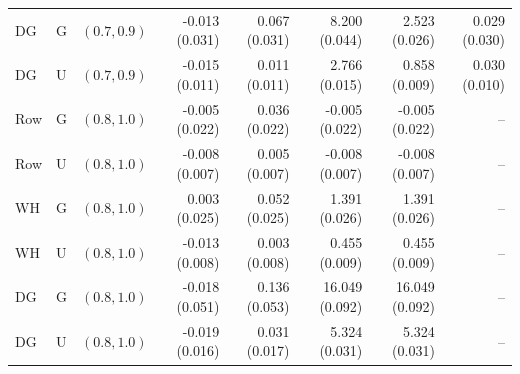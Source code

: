 \begin{tabular}{@{}lllrrrrr@{}}
DG & G & $(0.7,0.9)$ & -0.013 (0.031) & 0.067 (0.031) & 8.200 (0.044) & 2.523 (0.026) & 0.029 (0.030) \\
DG & U & $(0.7,0.9)$ & -0.015 (0.011) & 0.011 (0.011) & 2.766 (0.015) & 0.858 (0.009) & 0.030 (0.010) \\
\midrule
Row & G & $(0.8,1.0)$ & -0.005 (0.022) & 0.036 (0.022) & -0.005 (0.022) & -0.005 (0.022) & -- \\
Row & U & $(0.8,1.0)$ & -0.008 (0.007) & 0.005 (0.007) & -0.008 (0.007) & -0.008 (0.007) & -- \\
WH & G & $(0.8,1.0)$ & 0.003 (0.025) & 0.052 (0.025) & 1.391 (0.026) & 1.391 (0.026) & -- \\
WH & U & $(0.8,1.0)$ & -0.013 (0.008) & 0.003 (0.008) & 0.455 (0.009) & 0.455 (0.009) & -- \\
DG & G & $(0.8,1.0)$ & -0.018 (0.051) & 0.136 (0.053) & 16.049 (0.092) & 16.049 (0.092) & -- \\
DG & U & $(0.8,1.0)$ & -0.019 (0.016) & 0.031 (0.017) & 5.324 (0.031) & 5.324 (0.031) & -- \\
\bottomrule
\end{tabular}
